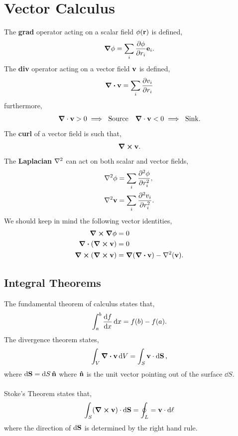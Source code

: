 \documentclass{book}
\begin{document}
\section{Vector Calculus}
The \textbf{grad} operator acting on a scalar field $\phi(\vb{r})$ is defined,
\begin{equation}
	\grad\phi = \sum_i\pdv{\phi}{r_i}\vb{e}_i.
\end{equation}
The \textbf{div} operator acting on a vector field $\vb{v}$ is defined,
\begin{equation}
	\div{\vb{v}} = \sum_i \pdv{v_i}{r_i}
\end{equation}
furthermore,
\begin{align}
	\grad\cdot\vb{v} > 0 \implies \text{ Source} && \grad\cdot\vb{v} < 0 \implies \text{ Sink}.
\end{align}
The \textbf{curl} of a vector field is such that,
\begin{equation}
	\curl{\vb{v}}.
\end{equation}
The \textbf{Laplacian} $\laplacian$ can act on both scalar and vector fields,
\begin{align}
	\laplacian{\phi} &= \sum_i \pdv[2]{\phi}{r_i},\\
	\laplacian{\vb{v}} &= \sum_i \pdv[2]{v_i}{r_i}.
\end{align}
We should keep in mind the following vector identities,
\begin{align}
	\grad \cross \grad{\phi} & = 0 \\
	\div{(\curl{\vb{v})}} & = 0 \\
	\curl{(\curl{\vb{v})}} & = \grad{(\div{\vb{v}})}-\laplacian(\vb{v}).
\end{align}
\subsection{Integral Theorems}
The fundamental theorem of calculus states that,
\begin{equation}
	\int_a^b \dv{f}{x}\dd{x} = f(b) - f(a).
\end{equation}
The divergence theorem states,
\begin{equation}
	\int_V \div{\vb{v}} \dd{V} = \int_S \vb{v}\cdot\dd{\vb{S}},
\end{equation}
where $\dd{\vb{S}} = \dd{S}\vu{n}$ where $\vu{n}$ is the unit vector pointing out of the surface $\dd{S}$.
\\\\
Stoke's Theorem states that,
\begin{equation}
	\int_S(\curl{\vb{v}})\cdot\dd{\vb{S}} = \oint_L = \vb{v}\cdot\dd{\vb{\ell}}
\end{equation}
where the direction of $\dd{\vb{S}}$ is determined by the right hand rule.
\end{document}
